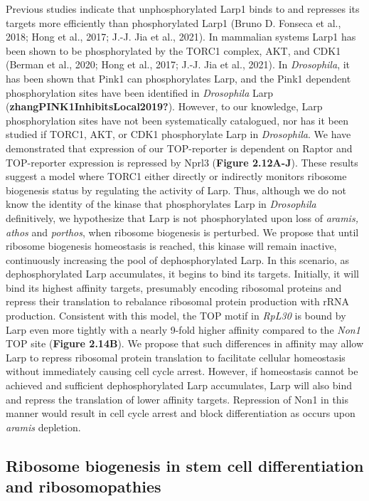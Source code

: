 \documentclass[12pt,oneside]{reedthesis}
\begin{document}
Previous studies indicate that unphosphorylated Larp1 binds to and
represses its targets more efficiently than phosphorylated Larp1
(Bruno D. Fonseca et al., 2018; Hong et al., 2017; J.-J. Jia et al., 2021). In mammalian systems Larp1 has been shown
to be phosphorylated by the TORC1 complex, AKT, and CDK1
(Berman et al., 2020; Hong et al., 2017; J.-J. Jia et al., 2021). In \emph{Drosophila}, it has been shown that
Pink1 can phosphorylates Larp, and the Pink1 dependent phosphorylation
sites have been identified in \emph{Drosophila} Larp
(\textbf{zhangPINK1InhibitsLocal2019?}). However, to our knowledge, Larp
phosphorylation sites have not been systematically catalogued, nor has
it been studied if TORC1, AKT, or CDK1 phosphorylate Larp in
\emph{Drosophila}. We have demonstrated that expression of our TOP-reporter
is dependent on Raptor and TOP-reporter expression is repressed by Nprl3 (\textbf{Figure 2.12A-J}).
These results suggest a model where TORC1 either
directly or indirectly monitors ribosome biogenesis status by regulating
the activity of Larp. Thus, although we do not know the identity of the
kinase that phosphorylates Larp in \emph{Drosophila} definitively, we
hypothesize that Larp is not phosphorylated upon loss of \emph{aramis, athos}
and \emph{porthos}, when ribosome biogenesis is perturbed. We propose that
until ribosome biogenesis homeostasis is reached, this kinase will
remain inactive, continuously increasing the pool of dephosphorylated
Larp. In this scenario, as dephosphorylated Larp accumulates, it begins
to bind its targets. Initially, it will bind its highest affinity
targets, presumably encoding ribosomal proteins and repress their
translation to rebalance ribosomal protein production with rRNA
production. Consistent with this model, the TOP motif in \emph{RpL30} is
bound by Larp even more tightly with a nearly 9-fold higher affinity
compared to the \emph{Non1} TOP site (\textbf{Figure 2.14B}).
We propose that such
differences in affinity may allow Larp to repress ribosomal protein
translation to facilitate cellular homeostasis without immediately
causing cell cycle arrest. However, if homeostasis cannot be achieved
and sufficient dephosphorylated Larp accumulates, Larp will also bind
and repress the translation of lower affinity targets. Repression of
Non1 in this manner would result in cell cycle arrest and block
differentiation as occurs upon \emph{aramis} depletion.

\hypertarget{ribosome-biogenesis-in-stem-cell-differentiation-and-ribosomopathies}{%
\subsection{Ribosome biogenesis in stem cell differentiation and ribosomopathies}\label{ribosome-biogenesis-in-stem-cell-differentiation-and-ribosomopathies}}
\end{document}
